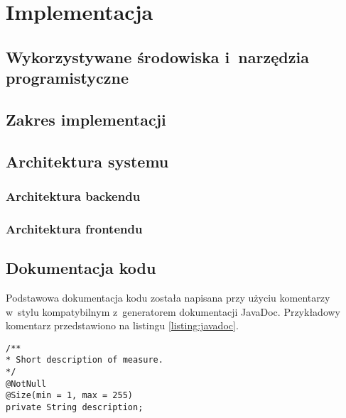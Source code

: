 \chapter{Implementacja}\label{ch:implementation}
\section{Wykorzystywane środowiska i~narzędzia programistyczne}\label{sec:dev-tools}

\lipsum[5]

\section{Zakres implementacji}\label{sec:implementation-scope}

\lipsum[5]

\section{Architektura systemu}\label{sec:system-architecture}

\lipsum[5]

\subsection{Architektura backendu}\label{subsec:system-architecture:backend}

\lipsum[5]

\subsection{Architektura frontendu}\label{subsec:system-architecture:frontend}

\lipsum[5]

\section{Dokumentacja kodu}\label{sec:code-documentation}

Podstawowa dokumentacja kodu została napisana przy użyciu komentarzy w~stylu kompatybilnym z~generatorem dokumentacji JavaDoc\cite{tech:javadoc}.
Przykładowy komentarz przedstawiono na listingu \ref{listing:javadoc}.

\noindent\hspace{.075\textwidth}\begin{minipage}{.85\textwidth}
    \begin{verbatim}
/**
* Short description of measure.
*/
@NotNull
@Size(min = 1, max = 255)
private String description;
    \end{verbatim}
    \begin{lstlisting}[caption={Komentarz w~stylu JavaDoc \source{\ownwork}}, label={listing:javadoc}]
\end{lstlisting}
\end{minipage}

